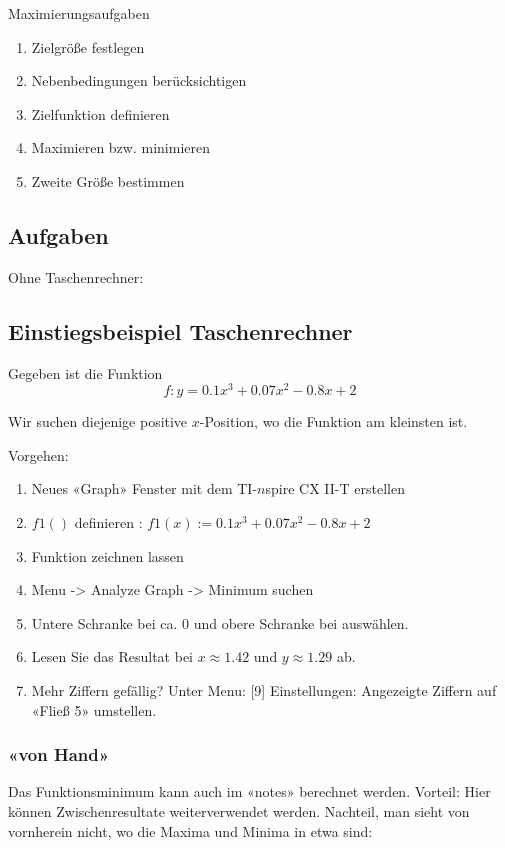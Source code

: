 \newpage
  \begin{rezept}{Maximierungsaufgaben}{}
    \begin{enumerate}
    \item Zielgröße festlegen
    \item Nebenbedingungen berücksichtigen
    \item Zielfunktion definieren
    \item Maximieren bzw. minimieren
    \item Zweite Größe bestimmen
      \end{enumerate}
\end{rezept}
  




\subsection*{Aufgaben}
Ohne Taschenrechner:

\newpage


\subsection{Einstiegsbeispiel Taschenrechner}
Gegeben ist die Funktion
$$f: y = 0.1 x^3 + 0.07 x^2 - 0.8 x + 2$$

Wir suchen diejenige positive $x$-Position, wo die Funktion am kleinsten ist.

Vorgehen:
\begin{enumerate}
\item Neues «Graph» Fenster mit dem TI-$n$spire CX II-T erstellen
\item $f1()$ definieren : $f1(x) := 0.1 x^3 + 0.07 x^2 - 0.8 x + 2$
\item Funktion zeichnen lassen
\item Menu -> Analyze Graph -> Minimum suchen
\item Untere Schranke bei ca. 0 und obere Schranke bei  auswählen.
\item Lesen Sie das Resultat bei $x\approx 1.42$ und $y\approx 1.29$ ab.
  \item Mehr Ziffern gefällig? Unter Menu: [9] Einstellungen: Angezeigte Ziffern auf \zB «Fließ 5» umstellen.
\end{enumerate}


\subsubsection{«von Hand»}
Das Funktionsminimum kann auch im «notes» berechnet werden. Vorteil: Hier können Zwischenresultate weiterverwendet werden. Nachteil, man sieht von vornherein nicht, wo die Maxima und Minima in etwa sind:

